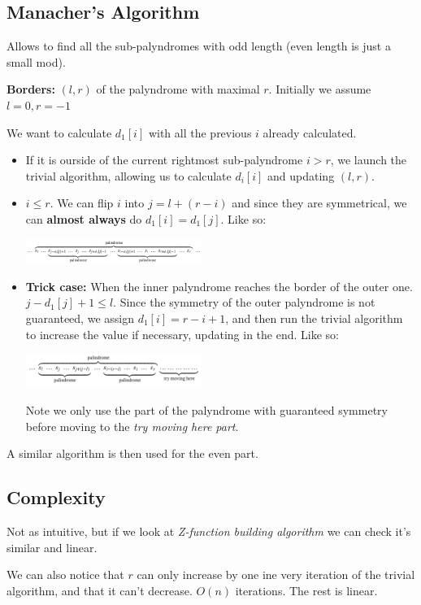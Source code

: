 \documentclass{IEEEtran}
\begin{document}
    \subsection{Manacher's Algorithm}
      Allows to find all the sub-palyndromes with odd length (even length is just a small mod).\par 
      \textbf{Borders:} $(l,r)$ of the palyndrome with maximal $r$. Initially we assume $l=0,r=-1$\par 
      We want to calculate $d_1[i]$ with all the previous $i$ already calculated.
      \begin{itemize}
        \item If it is ourside of the current rightmost sub-palyndrome $i > r$, we launch the trivial algorithm, allowing us to calculate $d_i[i]$ and updating $(l,r)$.
        \item $i \leq r$. We can flip $i$ into $j=l+(r-i)$ and since they are symmetrical, we can \textbf{almost always} do $d_1[i] = d_1[j]$. Like so: 
        \begin{center}
          \includegraphics[width = 0.45\textwidth]{manacherIllust.png}
        \end{center}
        \item \textbf{Trick case:} When the inner palyndrome reaches the border of the outer one. $j-d_1[j]+1\leq l$. Since the symmetry of the outer palyndrome is not guaranteed, we assign $d_1[i] = r - i + 1$, and then run the trivial algorithm to increase the value if necessary, updating in the end. Like so:
        \begin{center}
          \includegraphics[width=0.45\textwidth]{manacherTrick.png}
        \end{center}
        \par Note we only use the part of the palyndrome with guaranteed symmetry before moving to the \textit{try moving here part}. 
      \end{itemize}
      \par A similar algorithm is then used for the even part.
    \subsection{Complexity}
      Not as intuitive, but if we look at \textit{Z-function building algorithm} we can check it's similar and linear. \par 
      We can also notice that $r$ can only increase by one ine very iteration of the trivial algorithm, and that it can't decrease. $O(n)$ iterations. The rest is linear.
\end{document}
